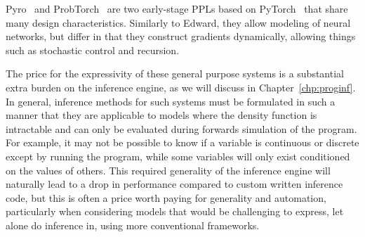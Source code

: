 Pyro~\citep{pyro-software} and ProbTorch~\citep{siddharth2017learning} are two early-stage PPLs based on 
PyTorch~\citep{paszke2017automatic} that share 
many design characteristics.  Similarly to Edward, they allow modeling of neural networks, but differ
in that they construct gradients dynamically, allowing things such as stochastic control and recursion.

The price for the expressivity of these general purpose systems is a substantial extra 
burden on the inference engine, as we will
discuss in Chapter~\ref{chp:proginf}.  In general, inference methods for such systems 
must be formulated in such a manner that they are applicable to models where the 
density function is intractable and can only be evaluated during forwards simulation of the program. 
For example, it may not be possible to know if a variable is continuous or discrete except by
running the program, while some variables will only exist conditioned on the values of others.
This required generality of the inference engine will naturally lead to a drop in performance compared to
custom written inference code, but this is often a price worth paying for generality and automation, particularly
when considering models that would be challenging to express, let alone do inference in, using more
conventional frameworks.